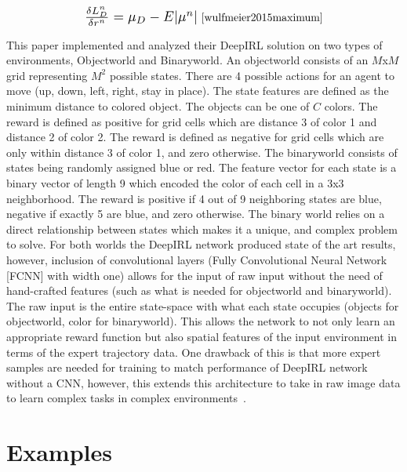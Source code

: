 \documentclass[12pt,american]{report}
\begin{document}
\begin{equation}
            \label{eq:maximum_entropy_gradient}
            \resizebox{0.3\textwidth}{!}{$\frac{\delta L_{D}^{n}}{\delta r^{n}}=\mu_D -  E|\mu^n|$}~\cite{wulfmeier2015maximum}%
        \end{equation}

This paper implemented and analyzed their DeepIRL solution on two types of environments, Objectworld and Binaryworld. An objectworld consists of an $M$x$M$ grid representing $M^2$ possible states.  There are 4 possible actions for an agent to move (up, down, left, right, stay in place). The state features are defined as the minimum distance to colored object.  The objects can be one of $C$ colors. The reward is defined as positive for grid cells which are distance 3 of color 1 and distance 2 of color 2. The reward is defined as negative for grid cells which are only within distance 3 of color 1, and zero otherwise.  The binaryworld consists of states being randomly assigned blue or red.  The feature vector for each state is a binary vector of length 9 which encoded the color of each cell in a 3x3 neighborhood. The reward is positive if 4 out of 9 neighboring states are blue, negative if exactly 5 are blue, and zero otherwise.  The binary world relies on a direct relationship between states which makes it a unique, and complex problem to solve. For both worlds the DeepIRL network produced state of the art results, however, inclusion of convolutional layers (Fully Convolutional Neural Network [FCNN] with width one) allows for the input of raw input without the need of hand-crafted features (such as what is needed for objectworld and binaryworld). The raw input is the entire state-space with what each state occupies (objects for objectworld, color for binaryworld). This allows the network to not only learn an appropriate reward function but also spatial features of the input environment in terms of the expert trajectory data.  One drawback of this is that more expert samples are needed for training to match performance of DeepIRL network without a CNN, however, this extends this architecture to take in raw image data to learn complex tasks in complex environments~\cite{wulfmeier2015maximum}.

\section{Examples}
\end{document}
